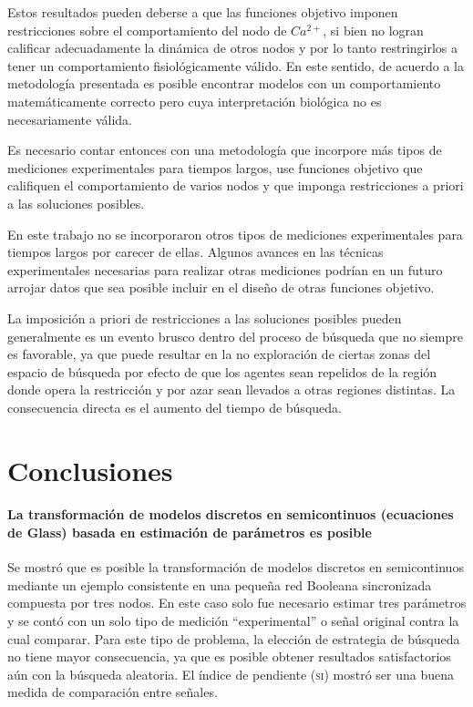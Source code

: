 Estos resultados pueden deberse a que las funciones objetivo imponen restricciones sobre el comportamiento del nodo de $Ca^{2+}$, si bien no logran calificar adecuadamente la dinámica de otros nodos y por lo tanto restringirlos a tener un comportamiento fisiológicamente válido. En este sentido, de acuerdo a la metodología presentada es posible encontrar modelos con un comportamiento matemáticamente correcto pero cuya interpretación biológica no es necesariamente válida. 

Es necesario contar entonces con una metodología que incorpore más tipos de mediciones experimentales para tiempos largos, use funciones objetivo que califiquen el comportamiento de varios nodos y que imponga restricciones a priori a las soluciones posibles. 

En este trabajo no se incorporaron otros tipos de mediciones experimentales para tiempos largos por carecer de ellas. Algunos avances en las técnicas experimentales necesarias para realizar otras mediciones podrían en un futuro arrojar datos que sea posible incluir en el diseño de otras funciones objetivo.

La imposición a priori de restricciones a las soluciones posibles pueden generalmente es un evento brusco dentro del proceso de búsqueda que no siempre es favorable, ya que puede resultar en la no exploración de ciertas zonas del espacio de búsqueda por efecto de que los agentes sean repelidos de la región donde opera la restricción y por azar sean llevados a otras regiones distintas. La consecuencia directa es el aumento del tiempo de búsqueda.


\section{Conclusiones}

\paragraph {La transformación de modelos discretos en semicontinuos (ecuaciones de Glass) basada en estimación de parámetros es posible}Se mostró que es posible la transformación de modelos discretos en semicontinuos mediante un ejemplo consistente en una pequeña red Booleana sincronizada compuesta por tres nodos. En este caso solo fue necesario estimar tres parámetros y se contó con un solo tipo de medición ``experimental'' o señal original contra la cual comparar. Para este tipo de problema, la elección de estrategia de búsqueda no tiene mayor consecuencia, ya que es posible obtener resultados satisfactorios aún con la búsqueda aleatoria. El índice de pendiente \textsc{(si)} mostró ser una buena medida de comparación entre señales.  

